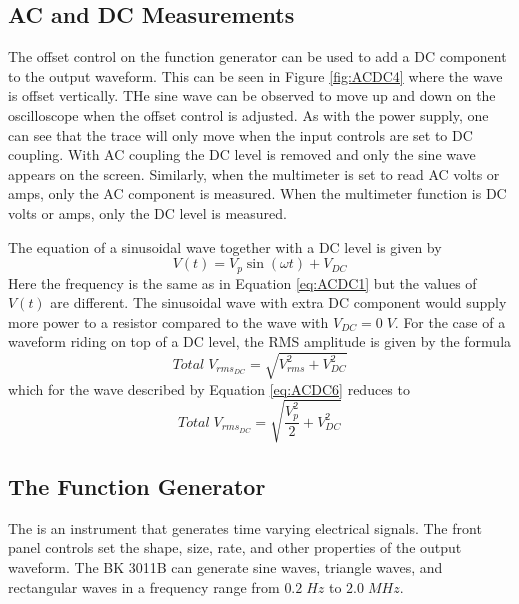 \subsection{AC and DC Measurements}

The offset control on the function generator can be used to add a DC component to the output waveform. This can be seen in Figure \ref{fig:ACDC4} where the wave is offset vertically. THe sine wave can be observed to move up and down on the oscilloscope when the offset control is adjusted. As with the power supply, one can see that the trace will only move when the input controls are set to DC coupling. With AC coupling the DC level is removed and only the sine wave appears on the screen. Similarly, when the multimeter is set to read AC volts or amps, only the AC component is measured. When the multimeter function is DC volts or amps, only the DC level is measured.

\noindent The equation of a sinusoidal wave together with a DC level is given by \begin{equation}\label{eq:ACDC6}
    V(t) = V_p\sin(\omega t)+V_{DC}
\end{equation}
Here the frequency is the same as in Equation \ref{eq:ACDC1} but the values of $V(t)$ are different. The sinusoidal wave with extra DC component would supply more power to a resistor compared to the wave with $V_{DC} = 0 \; V$. For the case of a waveform riding on top of a DC level, the RMS amplitude is given by the formula \begin{equation}\label{eq:ACDC7}
    Total\;V_{rms_{DC}} = \sqrt{V_{rms}^2+V_{DC}^2}
\end{equation}
which for the wave described by Equation \ref{eq:ACDC6} reduces to \begin{equation}\label{eq:ACDC8}
    Total\;V_{rms_{DC}} = \sqrt{\frac{V_p^2}{2}+V_{DC}^2}
\end{equation}


\subsection{The Function Generator}

The  is an instrument that generates time varying electrical signals. The front panel controls set the shape, size, rate, and other properties of the output waveform. The BK 3011B can generate sine waves, triangle waves, and rectangular waves in a frequency range from $0.2\;Hz$ to $2.0\;MHz$.

